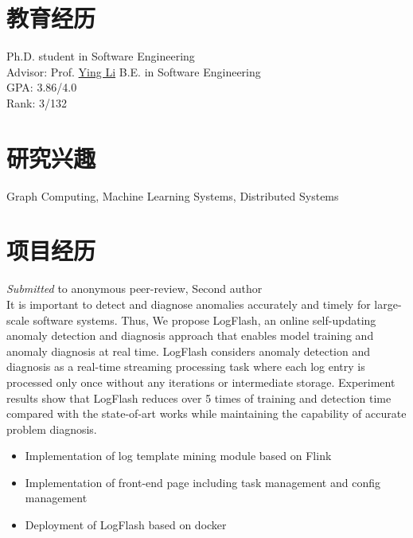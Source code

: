 \documentclass{resume}
\begin{document}



\section{教育经历}
Ph.D. student in Software Engineering\\
Advisor: Prof. \href{http://www.ss.pku.edu.cn/index.php/teacherteam/teacherlist/1674-%E6%9D%8E%E5%BD%B1}{Ying Li}
B.E. in Software Engineering\\
GPA: 3.86/4.0\\
Rank: 3/132

\section{研究兴趣}
Graph Computing, Machine Learning Systems, Distributed Systems

\section{项目经历}
\textit{Submitted} to anonymous peer-review, Second author\\
It is important to detect and diagnose anomalies accurately and timely for large-scale software systems. Thus, We propose LogFlash, an online self-updating anomaly detection and diagnosis approach that enables model training and anomaly diagnosis at real time. LogFlash considers anomaly detection and diagnosis as a real-time streaming processing task where each log entry is processed only once without any iterations or intermediate storage. Experiment results show that LogFlash reduces over 5 times of training and detection time compared with the state-of-art works while maintaining the capability of accurate problem diagnosis.
\begin{itemize}
  \item Implementation of log template mining module based on Flink
  \item Implementation of front-end page including task management and config management
  \item Deployment of LogFlash based on docker
\end{itemize}
\end{document}
